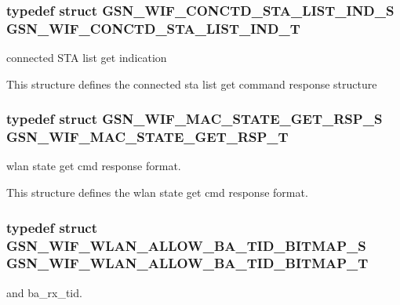 \label{a00677_ga2b01fa07922ed26ce73e38810a71c9ed}
\hypertarget{a00677_ga7709929fb1c332b2853a998d3b305561}{
\subsubsection[{GSN\_\-WIF\_\-CONCTD\_\-STA\_\-LIST\_\-IND\_\-T}]{\setlength{\rightskip}{0pt plus 5cm}typedef struct {\bf GSN\_\-WIF\_\-CONCTD\_\-STA\_\-LIST\_\-IND\_\-S} {\bf GSN\_\-WIF\_\-CONCTD\_\-STA\_\-LIST\_\-IND\_\-T}}}
\label{a00677_ga7709929fb1c332b2853a998d3b305561}


connected STA list get indication 

This structure defines the connected sta list get command response structure \hypertarget{a00677_ga6dbab71e19ca02665a3be40e8850b059}{
\subsubsection[{GSN\_\-WIF\_\-MAC\_\-STATE\_\-GET\_\-RSP\_\-T}]{\setlength{\rightskip}{0pt plus 5cm}typedef struct {\bf GSN\_\-WIF\_\-MAC\_\-STATE\_\-GET\_\-RSP\_\-S} {\bf GSN\_\-WIF\_\-MAC\_\-STATE\_\-GET\_\-RSP\_\-T}}}
\label{a00677_ga6dbab71e19ca02665a3be40e8850b059}


wlan state get cmd response format. 

This structure defines the wlan state get cmd response format. \hypertarget{a00677_gafb05388636305e014ec95505951eca42}{
\subsubsection[{GSN\_\-WIF\_\-WLAN\_\-ALLOW\_\-BA\_\-TID\_\-BITMAP\_\-T}]{\setlength{\rightskip}{0pt plus 5cm}typedef struct {\bf GSN\_\-WIF\_\-WLAN\_\-ALLOW\_\-BA\_\-TID\_\-BITMAP\_\-S} {\bf GSN\_\-WIF\_\-WLAN\_\-ALLOW\_\-BA\_\-TID\_\-BITMAP\_\-T}}}
\label{a00677_gafb05388636305e014ec95505951eca42}
and ba\_\-rx\_\-tid.

